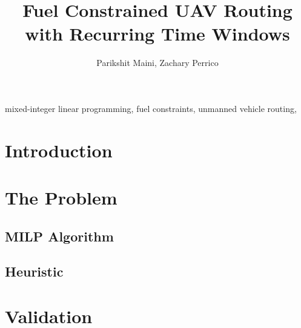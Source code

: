 \documentclass[conference]{IEEEtran}
\begin{document}
\title{Fuel Constrained UAV Routing with Recurring Time Windows
}

\author{Parikshit Maini, Zachary Perrico}

\maketitle

\begin{abstract}
        
\end{abstract}

\begin{IEEEkeywords}
mixed-integer linear programming,
fuel constraints,
unmanned vehicle routing,
\end{IEEEkeywords}

\section{Introduction}


% 

\section{The Problem}


\subsection{MILP Algorithm}


\subsection{Heuristic}


\section{Validation}


\nocite{*}


\end{document}
